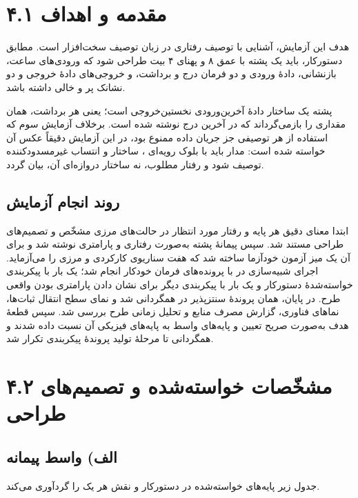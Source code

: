 \documentclass[12pt,a4paper]{article}
\begin{document}

	\section*{۴.۱ مقدمه و اهداف}
	هدف این آزمایش، آشنایی با توصیف رفتاری در زبان توصیف سخت‌افزار  است. مطابق دستورکار، باید یک پشته با عمق ۸ و پهنای ۴ بیت طراحی شود که ورودی‌های ساعت، بازنشانی، دادهٔ ورودی و دو فرمان درج و برداشت، و خروجی‌های دادهٔ خروجی و دو نشانک پر و خالی داشته باشد.

	پشته یک ساختار دادهٔ آخرین‌ورودی نخستین‌خروجی است؛ یعنی هر برداشت، همان مقداری را بازمی‌گرداند که در آخرین درج نوشته شده است. برخلاف آزمایش سوم که استفاده از هر توصیفی جز جریان داده ممنوع بود، در این آزمایش دقیقاً عکس آن خواسته شده است: مدار باید با بلوک رویه‌ای ، ساختار  و انتساب غیرمسدودکننده توصیف شود و رفتار مطلوب، نه ساختار دروازه‌ای آن، بیان گردد.

	\subsection*{روند انجام آزمایش}
	ابتدا معنای دقیق هر پایه و رفتار مورد انتظار در حالت‌های مرزی مشخّص و تصمیم‌های طراحی مستند شد. سپس پیمانهٔ پشته به‌صورت رفتاری و پارامتری نوشته شد و برای آن یک میز آزمون خودآزما ساخته شد که هفت سناریوی کارکردی و مرزی را می‌آزماید. اجرای شبیه‌سازی در  با پرونده‌های فرمان خودکار انجام شد؛ یک بار با پیکربندی خواسته‌شدهٔ دستورکار و یک بار با پیکربندی دیگر برای نشان دادن پارامتری بودن واقعی طرح. در پایان، همان پروندهٔ سنتز‌پذیر در  همگردانی شد و نمای سطح انتقال ثبات‌ها، نماهای فناوری، گزارش مصرف منابع و تحلیل زمانی طرح بررسی شد. سپس قطعهٔ هدف به‌صورت صریح تعیین و پایه‌های واسط به پایه‌های فیزیکی آن نسبت داده شدند و همگردانی تا مرحلهٔ تولید پروندهٔ پیکربندی تکرار شد.

	\section*{۴.۲ مشخّصات خواسته‌شده و تصمیم‌های طراحی}
	\subsection*{الف) واسط پیمانه}
	جدول زیر پایه‌های خواسته‌شده در دستورکار و نقش هر یک را گردآوری می‌کند.
\end{document}
